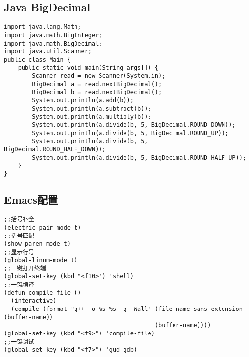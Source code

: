 \documentclass[a4paper]{article}
\begin{document}
\subsection{Java BigDecimal}
\begin{lstlisting}
import java.lang.Math;
import java.math.BigInteger;
import java.math.BigDecimal;
import java.util.Scanner;
public class Main {
    public static void main(String args[]) {
        Scanner read = new Scanner(System.in);
        BigDecimal a = read.nextBigDecimal();
        BigDecimal b = read.nextBigDecimal();
        System.out.println(a.add(b));
        System.out.println(a.subtract(b));
        System.out.println(a.multiply(b));
        System.out.println(a.divide(b, 5, BigDecimal.ROUND_DOWN));
        System.out.println(a.divide(b, 5, BigDecimal.ROUND_UP));
        System.out.println(a.divide(b, 5, BigDecimal.ROUND_HALF_DOWN));
        System.out.println(a.divide(b, 5, BigDecimal.ROUND_HALF_UP));
    }
}
\end{lstlisting}
\subsection{Emacs配置}
\begin{lstlisting}
;;括号补全
(electric-pair-mode t)
;;括号匹配
(show-paren-mode t)
;;显示行号
(global-linum-mode t)
;;一键打开终端
(global-set-key (kbd "<f10>") 'shell)
;;一键编译
(defun compile-file ()
  (interactive)
  (compile (format "g++ -o %s %s -g -Wall" (file-name-sans-extension (buffer-name)) 
                                           (buffer-name))))
(global-set-key (kbd "<f9>") 'compile-file)
;;一键调试
(global-set-key (kbd "<f7>") 'gud-gdb)
\end{lstlisting}
\end{document}
